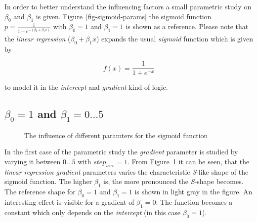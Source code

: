\documentclass[
  a4paper,
]{scrbook}
\begin{document}
In order to better understand the influencing factors a small parametric
study on \(\beta_0\) and \(\beta_1\) is given.
Figure~\ref{fig-sigmoid-params} the sigmoid function
\(p = \frac{1}{1+e^{-(\beta_0 + \beta_1x)}}\) with \(\beta_0=1\) and
\(\beta_1 = 1\) is shown as a reference. Please note that the
\emph{linear regression} (\(\beta_0 + \beta_1x\)) expands the usual
\emph{sigmoid} function which is given by

\[f(x) = \frac{1}{1+e^{-x}}\]

to model it in the \emph{intercept} and \emph{gradient} kind of logic.

\newpage{}

\subsection{\texorpdfstring{\(\beta_0 = 1\) and
\(\beta_1 = 0 \ldots 5\)}{\textbackslash beta\_0 = 1 and \textbackslash beta\_1 = 0 \textbackslash ldots 5}}\label{beta_0-1-and-beta_1-0-ldots-5}

\begin{figure}[H]


\caption{\label{fig-sigmoid-params02}The influence of different
paramters for the sigmoid function}

\end{figure}%

In the first case of the parametric study the \emph{gradient} parameter
is studied by varying it between \(0\ldots5\) with \(step_{size}=1\).
From Figure~\ref{fig-sigmoid-params02} it can be seen, that the
\emph{linear regression gradient} parameters varies the characteristic
\emph{S}-like shape of the sigmoid function. The higher \(\beta_1\) is,
the more pronounced the \emph{S}-shape becomes. The reference shape for
\(\beta_0 = 1\) and \(\beta_1 = 1\) is shown in light gray in the
figure. An interesting effect is visible for a gradient of
\(\beta_1 = 0\): The function becomes a constant which only depends on
the \emph{intercept} (in this case \(\beta_0=1\)).
\end{document}
